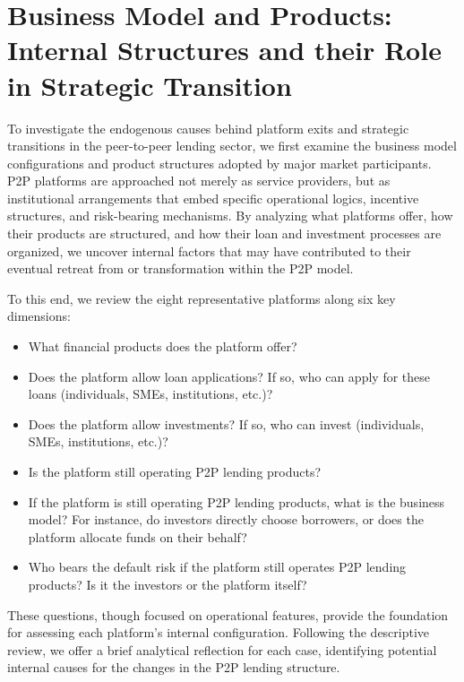 \documentclass[pdflatex,sn-apa]{sn-jnl}%
\theoremstyle{thmstyleone}%
\theoremstyle{thmstyletwo}%
\theoremstyle{thmstylethree}%
\begin{document}
\section{Business Model and Products: Internal Structures and their Role in Strategic Transition}

To investigate the endogenous causes behind platform exits and strategic transitions in the peer-to-peer lending sector, we first examine the business model configurations and product structures adopted by major market participants. P2P platforms are approached not merely as service providers, but as institutional arrangements that embed specific operational logics, incentive structures, and risk-bearing mechanisms. By analyzing what platforms offer, how their products are structured, and how their loan and investment processes are organized, we uncover internal factors that may have contributed to their eventual retreat from or transformation within the P2P model.

To this end, we review the eight representative platforms along six key dimensions: 
\begin{itemize} 
\item What financial products does the platform offer? 
\item Does the platform allow loan applications? If so, who can apply for these loans (individuals, SMEs, institutions, etc.)? 
\item Does the platform allow investments? If so, who can invest (individuals, SMEs, institutions, etc.)? 
\item Is the platform still operating P2P lending products?  
\item If the platform is still operating P2P lending products, what is the business model? For instance, do investors directly choose borrowers, or does the platform allocate funds on their behalf? 
\item Who bears the default risk if the platform still operates P2P lending products? Is it the investors or the platform itself? 
\end{itemize}

These questions, though focused on operational features, provide the foundation for assessing each platform’s internal configuration. Following the descriptive review, we offer a brief analytical reflection for each case, identifying potential internal causes for the changes in the P2P lending structure. 
\end{document}
